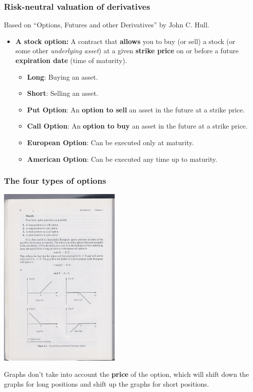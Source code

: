 \documentclass[handout]{beamer}
\begin{document}
\begin{frame}
\frametitle{Risk-neutral valuation of derivatives}
Based on ``Options, Futures and other Derivatives'' by John C. Hull.

\begin{itemize}
\item {\bf A stock option:} A contract that {\bf allows} you to buy
  (or sell) a stock (or some other {\em underlying asset}) at a given
  {\bf strike price} on or before a future {\bf expiration date} (time
  of maturity).
  \begin{itemize}
    \item {\bf Long}: Buying an asset.
    \item {\bf Short}: Selling an asset.
    \item {\bf Put Option}: An {\bf option to sell} an asset
      in the future at a strike price.
    \item {\bf Call Option}: An {\bf option to buy} an asset in
      the future at a strike price.
    \item {\bf European Option}: Can be executed only at maturity.
    \item {\bf American Option}: Can be executed any time up to maturity.
  \end{itemize}
\end{itemize}
\end{frame}

\begin{frame}
\frametitle{The four types of options}
\includegraphics[width=6cm]{4TypesOfOptions.pdf}

Graphs don't take into account the {\bf price} of the option, which will
shift down the graphs for long positions and shift up the graphs for short
positions.
\end{frame}
\end{document}
